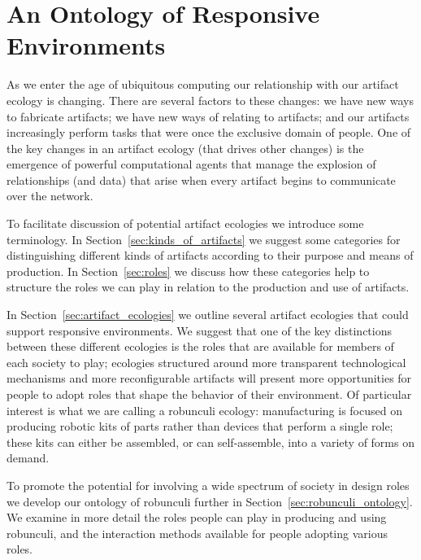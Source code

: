 \chapter{An Ontology of Responsive Environments}
\label{ch:ontology}
%
As we enter the age of ubiquitous computing \citep{weiser_1999} our relationship with our artifact ecology is changing. 
There are several factors to these changes: we have new ways to fabricate artifacts; we have new ways of relating to artifacts; and our artifacts increasingly perform tasks that were once the exclusive domain of people.
One of the key changes in an artifact ecology (that drives other changes) is the emergence of powerful computational agents that manage the explosion of relationships (and data) that arise when every artifact begins to communicate over the network.



To facilitate discussion of potential artifact ecologies we introduce some terminology.
In Section~\ref{sec:kinds_of_artifacts} we suggest some categories for distinguishing different kinds of artifacts according to their purpose and means of production.
In Section~\ref{sec:roles} we discuss how these categories help to structure the roles we can play in relation to the production and use of artifacts.

In Section~\ref{sec:artifact_ecologies} we outline several artifact ecologies that could support responsive environments. 
We suggest that one of the key distinctions between these different ecologies is the roles that are available for members of each society to play; ecologies structured around more transparent technological mechanisms and more reconfigurable artifacts will present more opportunities for people to adopt roles that shape the behavior of their environment. 
Of particular interest is what we are calling a robunculi ecology: manufacturing is focused on producing robotic kits of parts rather than devices that perform a single role; these kits can either be assembled, or can self-assemble, into a variety of forms on demand. 

To promote the potential for involving a wide spectrum of society in design roles we develop our ontology of robunculi further in Section~\ref{sec:robunculi_ontology}. 
We examine in more detail the roles people can play in producing and using robunculi, and the interaction methods available for people adopting various roles.

